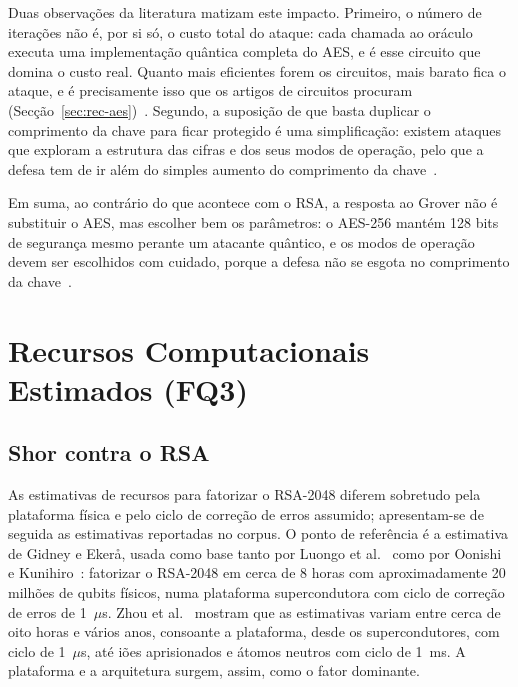\documentclass[11pt,a4paper]{article}
\begin{document}
Duas observações da literatura matizam este impacto. Primeiro, o número de iterações não é, por si só, o custo total do ataque: cada chamada ao oráculo executa uma implementação quântica completa do AES, e é esse circuito que domina o custo real. Quanto mais eficientes forem os circuitos, mais barato fica o ataque, e é precisamente isso que os artigos de circuitos procuram (Secção~\ref{sec:rec-aes})~\cite{wang2022,huang2022,liu2023}. Segundo, a suposição de que basta duplicar o comprimento da chave para ficar protegido é uma simplificação: existem ataques que exploram a estrutura das cifras e dos seus modos de operação, pelo que a defesa tem de ir além do simples aumento do comprimento da chave~\cite{chethana2025}.

Em suma, ao contrário do que acontece com o RSA, a resposta ao Grover não é substituir o AES, mas escolher bem os parâmetros: o AES-256 mantém 128 bits de segurança mesmo perante um atacante quântico, e os modos de operação devem ser escolhidos com cuidado, porque a defesa não se esgota no comprimento da chave~\cite{chethana2025}.

\clearpage

\section{Recursos Computacionais Estimados (FQ3)}\label{sec:recursos}

\subsection{Shor contra o RSA}\label{sec:rec-rsa}

As estimativas de recursos para fatorizar o RSA-2048 diferem sobretudo pela plataforma física e pelo ciclo de correção de erros assumido; apresentam-se de seguida as estimativas reportadas no corpus. O ponto de referência é a estimativa de Gidney e Ekerå, usada como base tanto por Luongo et al.~\cite{luongo2025} como por Oonishi e Kunihiro~\cite{oonishi2026}: fatorizar o RSA-2048 em cerca de 8 horas com aproximadamente 20 milhões de qubits físicos, numa plataforma supercondutora com ciclo de correção de erros de 1~$\mu$s. Zhou et al.~\cite{zhou2025} mostram que as estimativas variam entre cerca de oito horas e vários anos, consoante a plataforma, desde os supercondutores, com ciclo de 1~$\mu$s, até iões aprisionados e átomos neutros com ciclo de 1~ms. A plataforma e a arquitetura surgem, assim, como o fator dominante.
\end{document}
